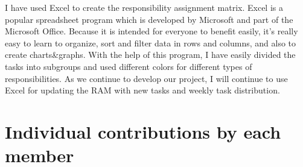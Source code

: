 \documentclass[]{article}
\begin{document}
I have used Excel to create the responsibility assignment matrix. Excel
is a popular spreadsheet program which is developed by Microsoft and
part of the Microsoft Office. Because it is intended for everyone to
benefit easily, it's really easy to learn to organize, sort and filter
data in rows and columns, and also to create charts\&graphs. With the
help of this program, I have easily divided the tasks into subgroups and
used different colors for different types of responsibilities. As we
continue to develop our project, I will continue to use Excel for
updating the RAM with new tasks and weekly task distribution.
\hypertarget{individual-contributions-by-each-member}{%
    \section{Individual contributions by each
      member}\label{individual-contributions-by-each-member}}
\end{document}
